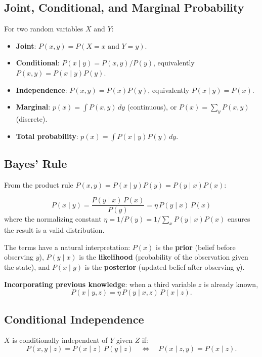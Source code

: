 \documentclass[11pt,a4paper]{article}
\theoremstyle{definition}
\theoremstyle{plain}
\theoremstyle{remark}
\begin{document}
\subsection{Joint, Conditional, and Marginal Probability}

For two random variables $X$ and $Y$:
\begin{itemize}
    \item \textbf{Joint}: $P(x, y) = P(X=x \text{ and } Y=y)$.
    \item \textbf{Conditional}: $P(x \mid y) = P(x,y)/P(y)$, equivalently $P(x,y) = P(x \mid y)P(y)$.
    \item \textbf{Independence}: $P(x,y) = P(x)P(y)$, equivalently $P(x \mid y) = P(x)$.
    \item \textbf{Marginal}: $p(x) = \int P(x,y)\,dy$ (continuous), or $P(x) = \sum_y P(x,y)$ (discrete).
    \item \textbf{Total probability}: $p(x) = \int P(x \mid y)P(y)\,dy$.
\end{itemize}

\subsection{Bayes' Rule}

From the product rule $P(x,y) = P(x \mid y)P(y) = P(y \mid x)P(x)$:

\begin{tcolorbox}[colback=blue!5!white,colframe=blue!75!black,title=\textbf{Bayes' Rule}]
\[
P(x \mid y) = \frac{P(y \mid x)\,P(x)}{P(y)} = \eta\, P(y \mid x)\,P(x)
\]
where the normalizing constant $\eta = 1/P(y) = 1/\sum_x P(y \mid x)P(x)$ ensures the result is a valid distribution.
\end{tcolorbox}

The terms have a natural interpretation: $P(x)$ is the \textbf{prior} (belief before observing $y$), $P(y \mid x)$ is the \textbf{likelihood} (probability of the observation given the state), and $P(x \mid y)$ is the \textbf{posterior} (updated belief after observing $y$).

\textbf{Incorporating previous knowledge}: when a third variable $z$ is already known,
\[
P(x \mid y, z) = \eta\, P(y \mid x, z)\, P(x \mid z).
\]

\subsection{Conditional Independence}

$X$ is conditionally independent of $Y$ given $Z$ if:
\[
P(x, y \mid z) = P(x \mid z)\,P(y \mid z) \quad \Longleftrightarrow \quad P(x \mid z, y) = P(x \mid z).
\]
\end{document}
